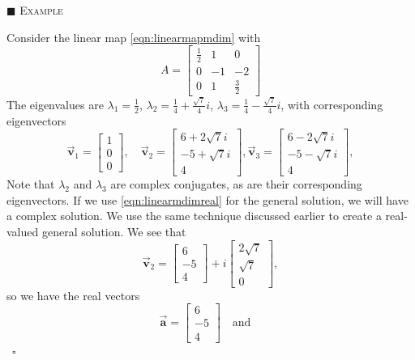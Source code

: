 \documentclass[reqno]{immbook}
\newcommand{\BA}{\vec{\textbf{a}}}
\newcommand{\BV}{\vec{\textbf{v}}}
\numberwithin{equation}{chapter}
\numberwithin{question}{section}
\numberwithin{theorem}{chapter}
\numberwithin{figure}{chapter}
\theoremstyle{definition}
\newenvironment{xexample}%
{%

\medskip\noindent\addtocounter{example}{1}$\blacksquare$ \textsc{Example \theexample}\hspace*{1em}%
}%
{%
~\hfill$\square$

\medskip
}
\begin{document}
\begin{xexample}
Consider the linear map \eqref{eqn:linearmapmdim} with
\begin{equation}
   A = \begin{bmatrix}
            \frac{1}{2} &  1  &  0 \\
              0         & -1  & -2 \\
              0         &  1  & \frac{3}{2}
       \end{bmatrix}
\end{equation}
The eigenvalues are
$\lambda_1 = \frac{1}{2}$,
$\lambda_2 = \frac{1}{4} + \frac{\sqrt{7}}{4}i$,
$\lambda_3 = \frac{1}{4} - \frac{\sqrt{7}}{4}i$,
with corresponding eigenvectors
\begin{equation}
  \BV_1 = \begin{bmatrix} 1  \\ 0 \\ 0 \end{bmatrix}, \quad
  \BV_2 = \begin{bmatrix} 6 + 2\sqrt{7}i \\ -5 + \sqrt{7} i \\ 4\end{bmatrix},
  \BV_3 = \begin{bmatrix} 6 - 2\sqrt{7}i \\ -5 - \sqrt{7} i \\ 4\end{bmatrix},
\end{equation}
Note that $\lambda_2$ and $\lambda_3$ are complex conjugates,
as are their corresponding eigenvectors.
If we use \eqref{eqn:linearmdimreal} for the general solution,
we will have a complex solution.  We use the same technique
discussed earlier to create a real-valued general solution.
We see that
\begin{equation}
   \BV_2 = \begin{bmatrix} 6 \\ -5 \\ 4 \end{bmatrix}
           + i \begin{bmatrix} 2\sqrt{7} \\ \sqrt{7} \\ 0\end{bmatrix}, 
\end{equation}
so we have the real vectors
\begin{equation}
    \BA = \begin{bmatrix} 6 \\ -5 \\ 4 \end{bmatrix} \quad \textrm{and} \quad

\end{equation}
\end{xexample}
\end{document}
